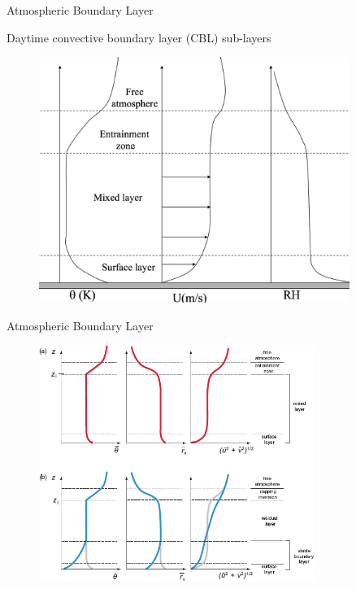 \begin{frame}{Atmospheric Boundary Layer}

Daytime convective boundary layer (CBL) sub-layers
\begin{figure}
	\includegraphics[width=0.9\textwidth]{abl2.png}
\end{figure}
\end{frame}

\begin{frame}{Atmospheric Boundary Layer}

\begin{figure}
	\includegraphics[width=0.8\textwidth]{abl3.jpg}
\end{figure}
\end{frame}

